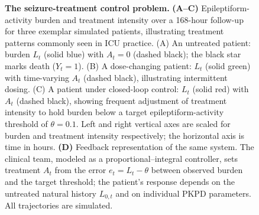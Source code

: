 \begin{figure}[htbp]
\caption{\textbf{The seizure-treatment control problem.} \textbf{(A--C)} Epileptiform-activity
burden and treatment intensity over a 168-hour follow-up for three exemplar simulated patients,
illustrating treatment patterns commonly seen in ICU practice. (A) An untreated patient: burden
$L_t$ (solid blue) with $A_t = 0$ (dashed black); the black star marks death ($Y_t = 1$). (B) A
dose-changing patient: $L_t$ (solid green) with time-varying $A_t$ (dashed black), illustrating
intermittent dosing. (C) A patient under closed-loop control: $L_t$ (solid red) with $A_t$ (dashed
black), showing frequent adjustment of treatment intensity to hold burden below a target
epileptiform-activity threshold of $\theta = 0.1$. Left and right vertical axes are scaled for
burden and treatment intensity respectively; the horizontal axis is time in hours. \textbf{(D)}
Feedback representation of the same system. The clinical team, modeled as a proportional--integral
controller, sets treatment $A_t$ from the error $e_t = L_t - \theta$ between observed burden and the
target threshold; the patient's response depends on the untreated natural history $L_{0,t}$ and on
individual PKPD parameters. All trajectories are simulated.}
\label{fig:control-problem}
\end{figure}

\FloatBarrier
